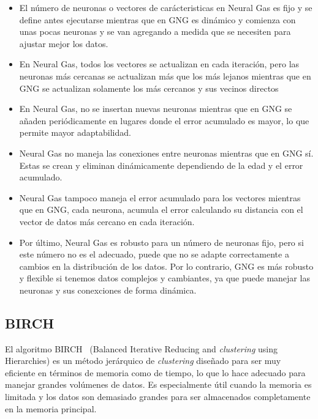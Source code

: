 \begin{itemize}
    \item El número de neuronas o vectores de carácteristicas en Neural Gas es fijo y se define antes ejecutarse mientras que en GNG es dinámico y comienza con unas pocas neuronas y se van agregando a medida que se necesiten para ajustar mejor los datos.
    \item En Neural Gas, todos los vectores se actualizan en cada iteración, pero las neuronas más cercanas se actualizan más que los más lejanos mientras que en GNG se actualizan solamente los más cercanos y sus vecinos directos
    \item En Neural Gas, no se insertan nuevas neuronas mientras que en GNG se añaden periódicamente en lugares donde el error acumulado es mayor, lo que permite mayor adaptabilidad.
    \item Neural Gas no maneja las conexiones entre neuronas mientras que en GNG sí. Estas se crean y eliminan dinámicamente dependiendo de la edad y el error acumulado.
    \item Neural Gas tampoco maneja el error acumulado para los vectores mientras que en GNG, cada neurona, acumula el error calculando su distancia con el vector de datos más cercano en cada iteración.
    \item Por último, Neural Gas es robusto para un número de neuronas fijo, pero si este número no es el adecuado, puede que no se adapte correctamente a cambios en la distribución de los datos. Por lo contrario, GNG es más robusto y flexible si tenemos datos complejos y cambiantes, ya que puede manejar las neuronas y sus conexciones de forma dinámica.
\end{itemize}

\subsection{BIRCH}

El algoritmo BIRCH~\cite{medium:BIRCH} (Balanced Iterative Reducing and \emph{clustering} using Hierarchies) es un método jerárquico de \emph{clustering} diseñado para ser muy eficiente en términos de memoria como de tiempo, lo que lo hace adecuado para manejar grandes volúmenes de datos. Es especialmente útil cuando la memoria es limitada y los datos son demasiado grandes para ser almacenados completamente en la memoria principal.


